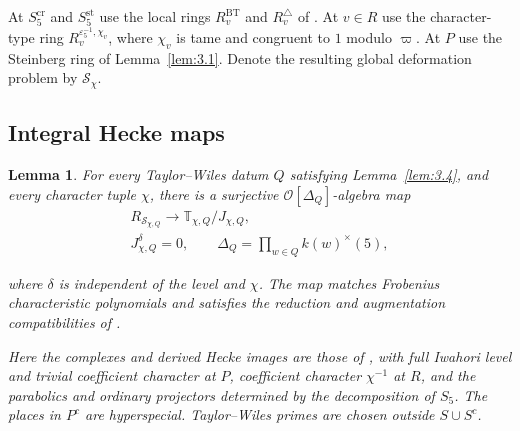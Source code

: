 \documentclass[11pt,a4paper]{article}
\newtheorem{lemma}[theorem]{Lemma}
\numberwithin{equation}{section}
\begin{document}
At \(S_5^{\mathrm{cr}}\) and \(S_5^{\mathrm{st}}\) use the local rings \(R_v^{\mathrm{BT}}\) and \(R_v^\triangle\) of \cite[\S5.3]{CN}. At \(v\in R\) use the character-type ring \(R_v^{\varepsilon_5^{-1},\chi_v}\), where \(\chi_v\) is tame and congruent to \(1\) modulo \(\varpi\). At \(P\) use the Steinberg ring of Lemma~\ref{lem:3.1}. Denote the resulting global deformation problem by \(\mathcal S_\chi\).

\subsection*{Integral Hecke maps}

\begin{lemma}\label{lem:4.1}
For every Taylor--Wiles datum \(Q\) satisfying Lemma~\ref{lem:3.4}, and every character tuple \(\chi\), there is a surjective \(\mathcal O[\Delta_Q]\)-algebra map
\begin{gather*}
R_{\mathcal S_{\chi,Q}}\longrightarrow
\mathbb T_{\chi,Q}/J_{\chi,Q},\\
J_{\chi,Q}^{\delta}=0,
\qquad \Delta_Q=\prod_{w\in Q}k(w)^\times(5),
\end{gather*}

where \(\delta\) is independent of the level and \(\chi\). The map matches Frobenius characteristic polynomials and satisfies the reduction and augmentation compatibilities of \cite[\S6.4.1]{ACC}.

Here the complexes and derived Hecke images are those of \cite[\S5.6]{CN}, with full Iwahori level and trivial coefficient character at \(P\), coefficient character \(\chi^{-1}\) at \(R\), and the parabolics and ordinary projectors determined by the decomposition of \(S_5\). The places in \(P^c\) are hyperspecial. Taylor--Wiles primes are chosen outside \(S\cup S^c\).
\end{lemma}
\end{document}
